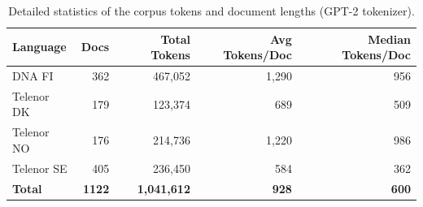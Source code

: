 \begin{table}[t]
\centering
\caption{Detailed statistics of the corpus tokens and document lengths (GPT-2 tokenizer).}
\label{tab:token_stats}
\begin{tabular}{lrrrr}
\toprule
\textbf{Language} & \textbf{Docs} & \textbf{Total Tokens} & \textbf{Avg Tokens/Doc} & \textbf{Median Tokens/Doc} \\
\midrule
DNA FI & 362 & 467{,}052 & 1{,}290 & 956 \\
Telenor DK & 179 & 123{,}374 & 689 & 509 \\
Telenor NO & 176 & 214{,}736 & 1{,}220 & 986 \\
Telenor SE & 405 & 236{,}450 & 584 & 362 \\
\midrule
\textbf{Total} & \textbf{1122} & \textbf{1{,}041{,}612} & \textbf{928} & \textbf{600} \\
\bottomrule
\end{tabular}
\end{table}
